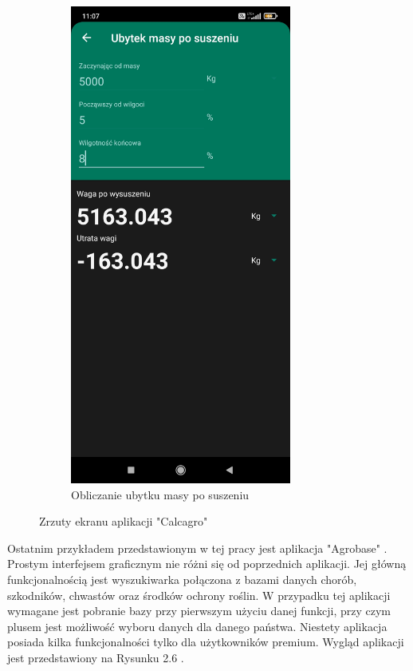 \documentclass[a4paper,12pt,oneside]{book}
\begin{document}
\begin{figure}[H]
\begin{subfigure}{.5\textwidth}
			\includegraphics[width=0.8\textwidth]{grafika/calc_1.jpg}
			\caption{Obliczanie ubytku masy po suszeniu}
		\end{subfigure}
		\caption{Zrzuty ekranu aplikacji "Calcagro"}
	\end{figure}
	
	Ostatnim przykładem przedstawionym w tej pracy jest aplikacja "Agrobase" \cite{ref8}. Prostym interfejsem graficznym nie różni się od poprzednich aplikacji. Jej główną funkcjonalnością jest wyszukiwarka połączona z bazami danych chorób, szkodników, chwastów oraz środków ochrony roślin. W przypadku tej aplikacji wymagane jest pobranie bazy przy pierwszym użyciu danej funkcji, przy czym plusem jest możliwość wyboru danych dla danego państwa. Niestety aplikacja posiada kilka funkcjonalności tylko dla użytkowników premium. Wygląd aplikacji jest przedstawiony na Rysunku 2.6 .
	
\end{document}
